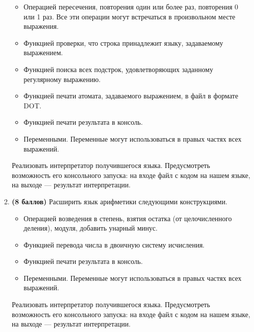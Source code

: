 \begin{enumerate}
\begin{itemize}
    \item Операцией пересечения, повторения один или более раз, повторения 0 или 1 раз. Все эти операции могут встречаться в произвольном месте выражения.
    \item Функцией проверки, что строка принадлежит языку, задаваемому выражением. 
    \item Функцией поиска всех подстрок, удовлетворяющих заданному регулярному выражению.
    \item Функцией печати атомата, задаваемого выражением, в файл в формате DOT. 
    \item Функцией печати результата в консоль.
    \item Переменными. Переменные могут использоваться в правых частях всех выражений.
  \end{itemize} 
  Реализовать интерпретатор получившегося языка. Предусмотреть возможность его консольного запуска: на входе файл с кодом на нашем языке, на выходе --- результат интерпретации.
  \item \textbf{(8 баллов)} Расширить язык арифметики следующими конструкциями.
  \begin{itemize}
    \item Операцией возведения в степень, взятия остатка (от целочисленного деления), модуля, добавить унарный минус.
    \item Функцией перевода числа в двоичную систему исчисления. 
    \item Функцией печати результата в консоль.
    \item Переменными. Переменные могут использоваться в правых частях всех выражений.
  \end{itemize} 
Реализовать интерпретатор получившегося языка. Предусмотреть возможность его консольного запуска: на входе файл с кодом на нашем языке, на выходе --- результат интерпретации.
 
\end{enumerate}
